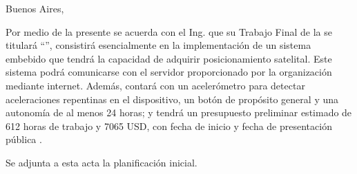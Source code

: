 \documentclass[
11pt, %
codirector, %
]{charter}
\begin{document}
\begin{flushright}
Buenos Aires, \fechaInicioName
\end{flushright}

\vspace{2cm}

Por medio de la presente se acuerda con el Ing. \authorname\hspace{1px} que su Trabajo Final de la \degreename\hspace{1px} se titulará ``\ttitle'', consistirá esencialmente en la implementación de un sistema embebido que tendrá la capacidad de adquirir posicionamiento satelital. Este sistema podrá comunicarse con el servidor proporcionado por la organización mediante internet. Además, contará con un acelerómetro para detectar aceleraciones repentinas en el dispositivo, un botón de propósito general y una autonomía de al menos 24 horas; y tendrá un presupuesto preliminar estimado de 612 horas de trabajo y 7065 USD, con fecha de inicio \fechaInicioName\hspace{1px} y fecha de presentación pública \fechaFinalName.

Se adjunta a esta acta la planificación inicial.

\vfill

\end{document}
